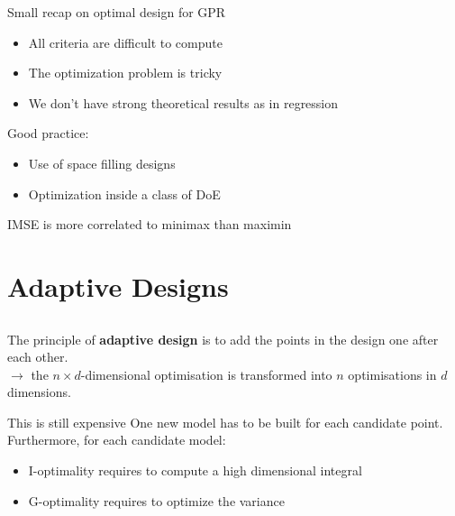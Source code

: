 \begin{frame}{}
Small recap on optimal design for GPR
\begin{itemize}
	\item All criteria are difficult to compute
	\item The optimization problem is tricky
	\item We don't have strong theoretical results as in regression
\end{itemize}
\vspace{3mm}
Good practice:
\begin{itemize}
	\item Use of space filling designs
	\item Optimization inside a class of DoE
\end{itemize}
\vspace{3mm}
 IMSE is more correlated to minimax than maximin
\end{frame}

\section[Adaptive DoE]{Adaptive Designs}
\subsection{}

\begin{frame}{}
The principle of \textbf{adaptive design} is to add the points in the design one after each other.\\
\qquad $\rightarrow$ the $n \times d$-dimensional optimisation is transformed into $n$  optimisations in $d$ dimensions.
\begin{block}{This is still expensive}
One new model has to be built for each candidate point. Furthermore, for each candidate model:
	\begin{itemize}
		\item I-optimality requires to compute a high dimensional integral
		\item G-optimality requires to optimize the variance
	\end{itemize}
\end{block}
\end{frame}

